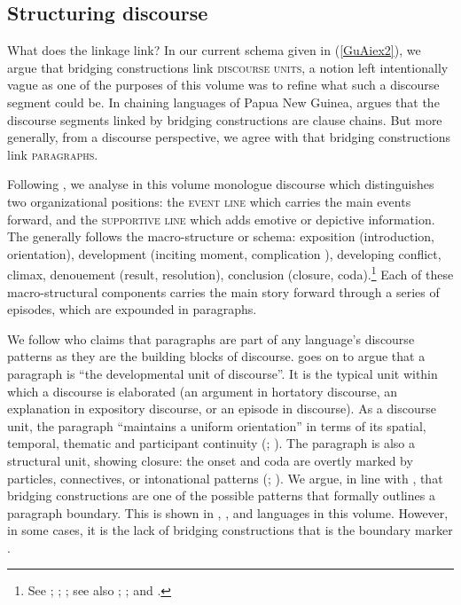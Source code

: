 \documentclass[output=paper]{LSP/langsci}
\begin{document}
\subsection{Structuring discourse} 
\label{GuAi43structdisc}

What does the linkage link? In our current schema given in (\ref{GuAiex2}), we argue that bridging constructions link \textsc{discourse units}, a notion left intentionally vague as one of the purposes of this volume was to refine what such a discourse segment could be. In chaining languages of Papua New Guinea,  \citet[][363]{devries.2005} argues that the discourse segments linked by bridging constructions are clause chains.  But more generally, from a discourse perspective, we agree with \citet[][272--274]{Thompson.et.al.2007} that bridging constructions link \textsc{paragraphs}. 

Following \citet[][14--17]{longacre83}, we analyse in this volume monologue discourse which distinguishes two organizational positions: the \textsc{event line} which carries the main events forward, and the \textsc{supportive line} which adds emotive or depictive information. The  generally follows the macro-structure or schema: exposition (introduction, orientation), development (inciting moment, complication ), developing conflict, climax, denouement (result, resolution), conclusion (closure, coda).\footnote{See \citealt[][277]{chafe01}; \citealt[][637--639]{johnstone01}; \citealt[][21--24, 38--41]{longacre83}; see also \citealt{Gleason68};  \citealt{Labov67}; and \citealt{Dijk77}.} Each of these macro-structural components carries the main story forward through a series of episodes, which are expounded in paragraphs. 

We follow  \citet[][116]{longacre79} who claims that paragraphs are part of any language’s discourse patterns as they are the building blocks of discourse. \citet[][295]{longacre83} goes on to argue that a paragraph is ``the developmental unit of discourse''. It is the typical unit within which a discourse  is elaborated (an argument in hortatory discourse, an explanation in expository discourse, or an episode in  discourse). As a discourse unit, the paragraph ``maintains a uniform orientation'' \citep[][136]{hinds79} in terms of its spatial, temporal, thematic and participant continuity (\citealt[][7--10]{givon83}; \citealt[][115--120]{longacre79}). The paragraph is also a structural unit, showing closure: the onset and coda are overtly marked by particles, connectives, or intonational patterns (\citealt[][Chap. 5]{Dijk77}; \citealt[][895--896]{seifart10}). We argue, in line with \citet[][9]{longacre83}, that bridging constructions are one of the possible patterns that formally outlines a paragraph boundary. This is shown in , ,  and  languages in this volume. However, in some cases, it is the lack of bridging constructions that is the boundary marker \citep[][337]{farr99}.
\end{document}
